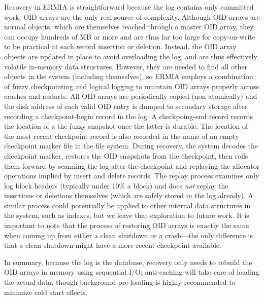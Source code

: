 Recovery in ERMIA is straightforward because the log contains only committed work; OID arrays are the only real source of complexity. Although OID arrays are normal objects, which are themselves reached through a master OID array, they can occupy hundreds of MB or more and are thus far too large for copy-on-write to be practical at each record insertion or deletion. Instead, the OID array objects are updated in place to avoid overloading the log, and are thus effectively volatile in-memory data structures. However, they are needed to find all other objects in the system (including themselves), so ERMIA employs a combination of fuzzy checkpointing and logical logging to maintain OID arrays properly across crashes and restarts. All OID arrays are periodically copied (non-atomically) and the disk address of each valid OID entry is dumped to secondary storage after recording a checkpoint-begin record in the log. A checkpoing-end record records the location of a the fuzzy snapshot once the latter is durable. The location of the most recent checkpoint record is also recorded in the name of an empty checkpoint marker file in the file system. During recovery, the system decodes the checkpoint marker, restores the OID snapshots from the checkpoint, then rolls them forward by scanning the log after the checkpoint and replaying the allocator operations implied by insert and delete records. The replay process examines only log block headers (typically under 10\% a block) and does {\em not} replay the insertions or deletions themselves (which are safely stored in the log already). A similar process could potentially be applied to other internal data structures in the system, such as indexes, but we leave that exploration to future work. It is important to note that the process of restoring OID arrays is exactly the same when coming up from either a clean shutdown or a crash---the only difference is that a clean shutdown might have a more recent checkpoint available.

In summary, because the log is the database, recovery only needs to rebuild the OID arrays in memory using sequential I/O; anti-caching will take care of loading the actual data, though background pre-loading is highly recommended to minimize cold start effects.

%
